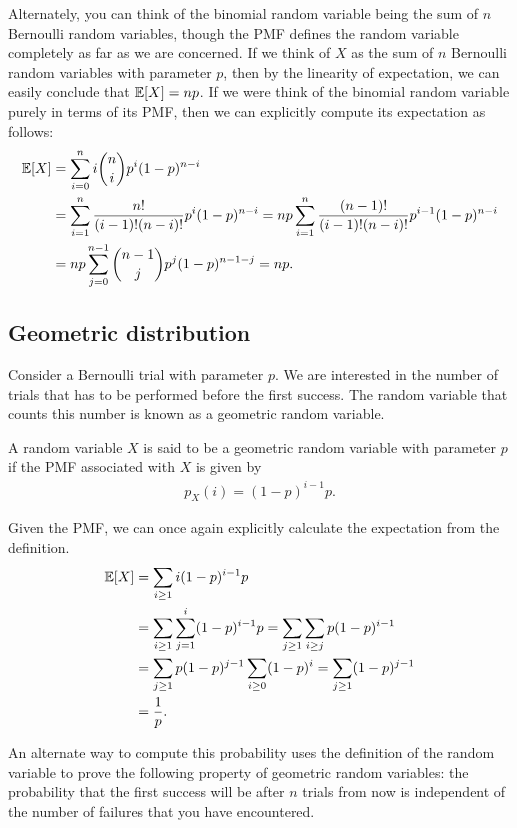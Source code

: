 Alternately, you can think of the binomial random variable being the sum of $n$ Bernoulli random variables, though the PMF defines the random variable completely as far as we are concerned. If we think of $X$ as the sum of $n$ Bernoulli random variables with parameter $p$, then by the linearity of expectation, we can easily conclude that $\mathbb{E}[X]=np$. If we were think of the binomial random variable purely in terms of its PMF, then we can explicitly compute its expectation as follows:
\begin{align*}
	\mathbb{E}[X] &= \sum_{i=0}^n i \binom{n}{i} p^i (1-p)^{n-i}\\
	&= \sum_{i=1}^n \frac{n!}{(i-1)!(n-i)!} p^i (1-p)^{n-i} = np\sum_{i=1}^n \frac{(n-1)!}{(i-1)!(n-i)!}p^{i-1}(1-p)^{n-i}\\
	&=np\sum_{j=0}^{n-1} \binom{n-1}{j}p^j(1-p)^{n-1-j} = np.
\end{align*}

\subsection{Geometric distribution}

Consider a Bernoulli trial with parameter $p$. We are interested in the number of trials that has to be performed before the first success. The random variable that counts this number is known as a geometric random variable.

\begin{definition}
	A random variable $X$ is said to be a geometric random variable with parameter $p$ if the PMF associated with $X$ is given by
	\begin{align*}
		p_X(i) = (1-p)^{i-1} p.
	\end{align*}
\end{definition}

Given the PMF, we can once again explicitly calculate the expectation from the definition.
\begin{align*}
	\mathbb{E}[X] &= \sum_{i\geq 1} i (1-p)^{i-1}p \\
	&= \sum_{i \geq 1} \sum_{j=1}^i (1-p)^{i-1} p = \sum_{j\geq 1} \sum_{i\geq j} p(1-p)^{i-1}\\
	&= \sum_{j \geq 1} p(1-p)^{j-1} \sum_{i\geq 0} (1-p)^{i} = \sum_{j \geq 1} (1-p)^{j-1}\\
	&= \frac{1}{p}.
\end{align*}

An alternate way to compute this probability uses the definition of the random variable to prove the following property of geometric random variables: the probability that the first success will be after $n$ trials from now is independent of the number of failures that you have encountered. 

